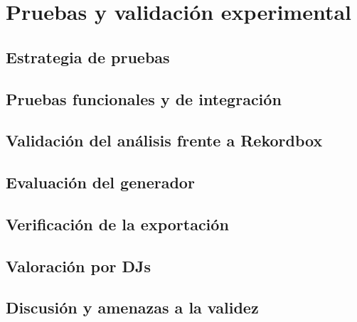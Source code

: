 
\chapter{Pruebas y validación experimental}
\label{cha:validacion}

\section{Estrategia de pruebas}
\label{sec:val-estrategia}


\section{Pruebas funcionales y de integración}
\label{sec:val-funcionales}


\section{Validación del análisis frente a Rekordbox}
\label{sec:val-analisis}


\section{Evaluación del generador}
\label{sec:val-generador}


\section{Verificación de la exportación}
\label{sec:val-exportacion}


\section{Valoración por DJs}
\label{sec:val-djs}


\section{Discusión y amenazas a la validez}
\label{sec:val-discusion}










